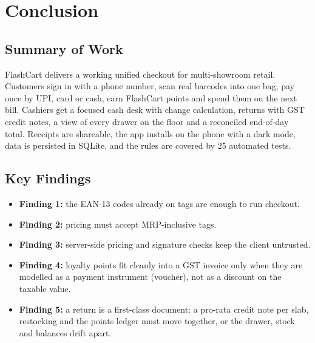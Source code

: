 \documentclass[12pt,letterpaper,twoside,openany]{report}
\begin{document}
\chapter{Conclusion}

\section{Summary of Work}
FlashCart delivers a working unified checkout for multi-showroom retail. Customers sign in
with a phone number, scan real barcodes into one bag, pay once by UPI, card or cash, earn
FlashCart points and spend them on the next bill. Cashiers get a focused cash desk with change
calculation, returns with GST credit notes, a view of every drawer on the floor and a
reconciled end-of-day total. Receipts are shareable, the app installs on the phone with a dark
mode, data is persisted in SQLite, and the rules are covered by 25 automated tests.

\section{Key Findings}
\begin{itemize}[leftmargin=*]
  \item \textbf{Finding 1:} the EAN-13 codes already on tags are enough to run checkout.
  \item \textbf{Finding 2:} pricing must accept MRP-inclusive tags.
  \item \textbf{Finding 3:} server-side pricing and signature checks keep the client untrusted.
  \item \textbf{Finding 4:} loyalty points fit cleanly into a GST invoice only when they are
        modelled as a payment instrument (voucher), not as a discount on the taxable value.
  \item \textbf{Finding 5:} a return is a first-class document: a pro-rata credit note per
        slab, restocking and the points ledger must move together, or the drawer, stock and
        balances drift apart.
\end{itemize}
\end{document}

